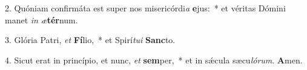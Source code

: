 2. Quóniam confirmáta est super nos misericórdi\textit{a} \textbf{e}jus:~*  et véritas Dómini manet \textit{in} \textit{æ}\textbf{tér}num.\

3. Glória Patri, \textit{et} \textbf{Fí}lio,~*  et Spirí\textit{tu}\textit{i} \textbf{Sanc}to.\

4. Sicut erat in princípio, et nunc, \textit{et} \textbf{sem}per,~*  et in sǽcula sæcu\textit{ló}\textit{rum}. \textbf{A}men.\

